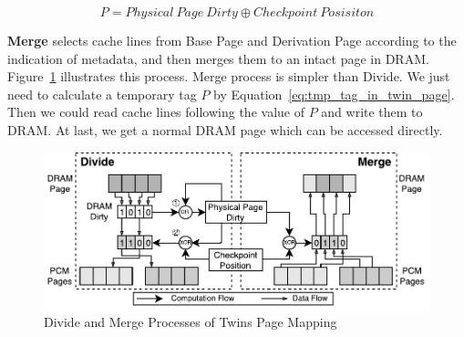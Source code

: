 \documentclass[conference]{IEEEtran}
\begin{document}
\begin{equation}
    P = Physical\ Page\ Dirty \oplus Checkpoint\ Posisiton
\label{eq:tmp_tag_in_twin_page}
\end{equation}

%

\textbf{Merge} selects cache lines from Base Page and Derivation Page according to the indication of metadata, and then merges them to an intact page in DRAM\@.
Figure~\ref{fig:divide_and_merge} illustrates this process.
Merge process is simpler than Divide.
We just need to calculate a temporary tag $P$ by Equation~\ref{eq:tmp_tag_in_twin_page}.
Then we could read cache lines following the value of $P$ and write them to DRAM\@.
At last, we get a normal DRAM page which can be accessed directly.

\begin{figure}
    \includegraphics[width=\columnwidth]{dram_and_pcm}
    \caption{Divide and Merge Processes of Twins Page Mapping}
\label{fig:divide_and_merge}
\end{figure}


%
%
\end{document}
